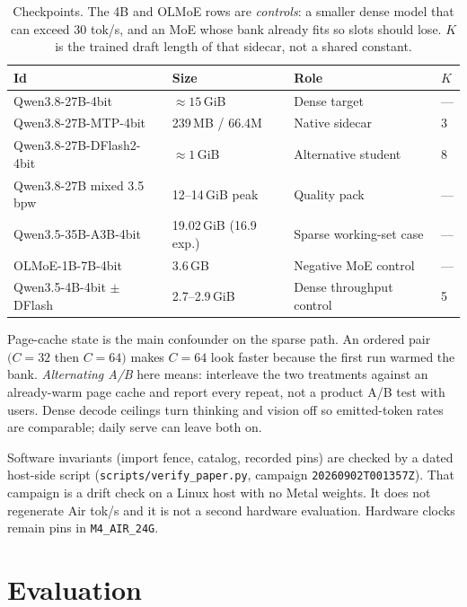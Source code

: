 \documentclass[11pt]{article}
\theoremstyle{definition}
\begin{document}
\begin{table}[t]
\centering
\caption{Checkpoints. The 4B and OLMoE rows are \emph{controls}: a smaller dense model that can exceed 30 tok/s, and an MoE whose bank already fits so slots should lose. $K$ is the trained draft length of that sidecar, not a shared constant.}
\label{tab:ckpt}
\small
\begin{tabular}{@{}llll@{}}
\toprule
Id & Size & Role & $K$ \\
\midrule
Qwen3.8-27B-4bit & ${\approx}15$\,GiB & Dense target & --- \\
Qwen3.8-27B-MTP-4bit & 239\,MB / 66.4M & Native sidecar & 3 \\
Qwen3.8-27B-DFlash2-4bit & ${\approx}1$\,GiB & Alternative student & 8 \\
Qwen3.8-27B mixed 3.5\,bpw & 12--14\,GiB peak & Quality pack & --- \\
Qwen3.5-35B-A3B-4bit & 19.02\,GiB (16.9 exp.) & Sparse working-set case & --- \\
OLMoE-1B-7B-4bit & 3.6\,GB & Negative MoE control & --- \\
Qwen3.5-4B-4bit $\pm$ DFlash & 2.7--2.9\,GiB & Dense throughput control & 5 \\
\bottomrule
\end{tabular}
\end{table}

Page-cache state is the main confounder on the sparse path. An ordered pair $(C{=}32$ then $C{=}64)$ makes $C{=}64$ look faster because the first run warmed the bank. \emph{Alternating A/B} here means: interleave the two treatments against an already-warm page cache and report every repeat, not a product A/B test with users. Dense decode ceilings turn thinking and vision off so emitted-token rates are comparable; daily serve can leave both on.

Software invariants (import fence, catalog, recorded pins) are checked by a dated host-side script (\texttt{scripts/verify\_paper.py}, campaign \texttt{20260902T001357Z}). That campaign is a drift check on a Linux host with no Metal weights. It does not regenerate Air tok/s and it is not a second hardware evaluation. Hardware clocks remain pins in \texttt{M4\_AIR\_24G}.

\section{Evaluation}
\label{sec:eval}
\end{document}
